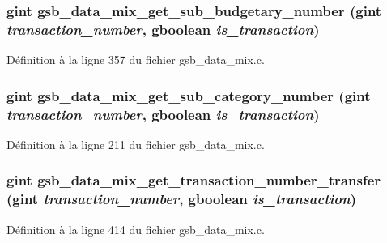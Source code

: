 \subsubsection[{gsb\_\-data\_\-mix\_\-get\_\-sub\_\-budgetary\_\-number}]{\setlength{\rightskip}{0pt plus 5cm}gint gsb\_\-data\_\-mix\_\-get\_\-sub\_\-budgetary\_\-number (gint {\em transaction\_\-number}, \/  gboolean {\em is\_\-transaction})}\label{gsb__data__mix_8c_a506db91a5bcc2237ef00303b469d1d9e}


Définition à la ligne 357 du fichier gsb\_\-data\_\-mix.c.

\subsubsection[{gsb\_\-data\_\-mix\_\-get\_\-sub\_\-category\_\-number}]{\setlength{\rightskip}{0pt plus 5cm}gint gsb\_\-data\_\-mix\_\-get\_\-sub\_\-category\_\-number (gint {\em transaction\_\-number}, \/  gboolean {\em is\_\-transaction})}\label{gsb__data__mix_8c_a9457ca7226d64e11bbbf1120c9d5a660}


Définition à la ligne 211 du fichier gsb\_\-data\_\-mix.c.

\subsubsection[{gsb\_\-data\_\-mix\_\-get\_\-transaction\_\-number\_\-transfer}]{\setlength{\rightskip}{0pt plus 5cm}gint gsb\_\-data\_\-mix\_\-get\_\-transaction\_\-number\_\-transfer (gint {\em transaction\_\-number}, \/  gboolean {\em is\_\-transaction})}\label{gsb__data__mix_8c_a99e5d9e76610f78b4aa4a5d0693af581}


Définition à la ligne 414 du fichier gsb\_\-data\_\-mix.c.

